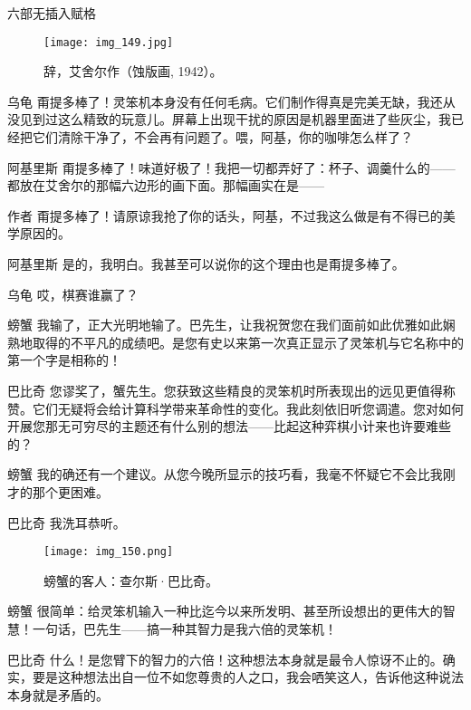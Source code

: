 \begin{dialog}{六部无插入赋格}
\begin{dialogue}
\begin{figure}
\texttt{[image: img\_149.jpg]}
\caption[辞，艾舍尔作。]
  {辞，艾舍尔作（蚀版画, 1942）。}
\end{figure}

\item[乌龟]甭提多棒了！灵笨机本身没有任何毛病。它们制作得真是完美无缺，我还从没见到过这么精致的玩意儿。屏幕上出现干扰的原因是机器里面进了些灰尘，我已经把它们清除干净了，不会再有问题了。喂，阿基，你的咖啡怎么样了？

\item[阿基里斯]甭提多棒了！味道好极了！我把一切都弄好了：杯子、调羹什么的——都放在艾舍尔的那幅六边形的画下面。那幅画实在是——

\item[作者]甭提多棒了！请原谅我抢了你的话头，阿基，不过我这么做是有不得已的美学原因的。

\item[阿基里斯]是的，我明白。我甚至可以说你的这个理由也是甭提多棒了。

\item[乌龟]哎，棋赛谁赢了？

\item[螃蟹]我输了，正大光明地输了。巴先生，让我祝贺您在我们面前如此优雅如此娴熟地取得的不平凡的成绩吧。是您有史以来第一次真正显示了灵笨机与它名称中的第一个字是相称的！

\item[巴比奇]您谬奖了，蟹先生。您获致这些精良的灵笨机时所表现出的远见更值得称赞。它们无疑将会给计算科学带来革命性的变化。我此刻依旧听您调遣。您对如何开展您那无可穷尽的主题还有什么别的想法——比起这种弈棋小计来也许要难些的？

\item[螃蟹]我的确还有一个建议。从您今晚所显示的技巧看，我毫不怀疑它不会比我刚才的那个更困难。

\item[巴比奇]我洗耳恭听。

\begin{figure}
\texttt{[image: img\_150.png]}
\caption[查尔斯·巴比奇。]
  {螃蟹的客人：查尔斯·巴比奇。}
\end{figure}

\item[螃蟹]很简单：给灵笨机输入一种比迄今以来所发明、甚至所设想出的更伟大的智慧！一句话，巴先生——搞一种其智力是我六倍的灵笨机！

\item[巴比奇]什么！是您臂下的智力的六倍！这种想法本身就是最令人惊讶不止的。确实，要是这种想法出自一位不如您尊贵的人之口，我会哂笑这人，告诉他这种说法本身就是矛盾的。


\end{dialogue}
\end{dialog}
